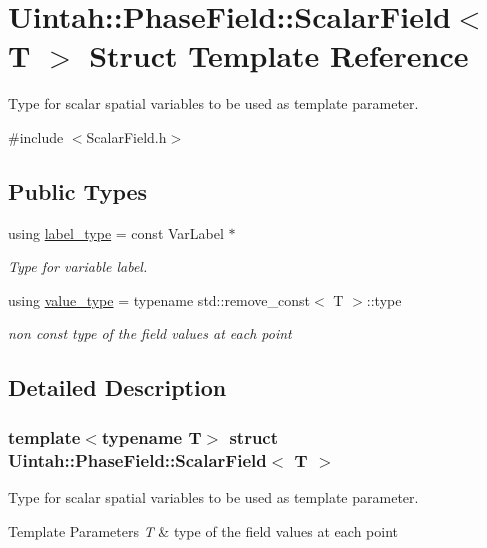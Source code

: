 \hypertarget{structUintah_1_1PhaseField_1_1ScalarField}{}\section{Uintah\+:\+:Phase\+Field\+:\+:Scalar\+Field$<$ T $>$ Struct Template Reference}
\label{structUintah_1_1PhaseField_1_1ScalarField}


Type for scalar spatial variables to be used as template parameter.  




{\ttfamily \#include $<$Scalar\+Field.\+h$>$}

\subsection*{Public Types}
\begin{DoxyCompactItemize}
\item 
using \hyperlink{structUintah_1_1PhaseField_1_1ScalarField_a7a77875e030da64c47ce9f6c22a06959}{label\+\_\+type} = const Var\+Label $\ast$
\begin{DoxyCompactList}\small\item\em Type for variable label. \end{DoxyCompactList}\item 
using \hyperlink{structUintah_1_1PhaseField_1_1ScalarField_a76adf747ae93f9113d404af391d1fffd}{value\+\_\+type} = typename std\+::remove\+\_\+const$<$ T $>$\+::type
\begin{DoxyCompactList}\small\item\em non const type of the field values at each point \end{DoxyCompactList}\end{DoxyCompactItemize}


\subsection{Detailed Description}
\subsubsection*{template$<$typename T$>$\newline
struct Uintah\+::\+Phase\+Field\+::\+Scalar\+Field$<$ T $>$}

Type for scalar spatial variables to be used as template parameter. 


\begin{DoxyTemplParams}{Template Parameters}
{\em T} & type of the field values at each point \\
\hline
\end{DoxyTemplParams}


